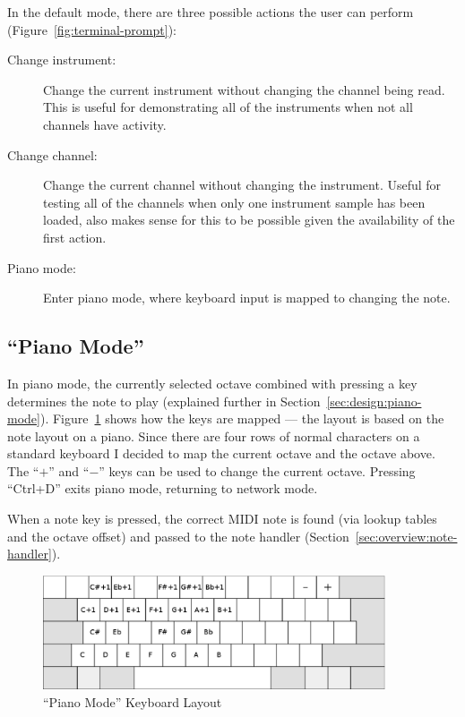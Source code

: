In the default mode, there are three possible actions the user can perform 
(Figure~\ref{fig:terminal-prompt}):

\begin{description}
\item[Change instrument:] Change the current instrument without changing the channel being read.  
This is useful for demonstrating all of the instruments when not all channels have activity.
\item[Change channel:] Change the current channel without changing the instrument.  Useful for 
testing all of the channels when only one instrument sample has been loaded, also makes sense for 
this to be possible given the availability of the first action.
\item[Piano mode:] Enter piano mode, where keyboard input is mapped to changing the note.
\end{description}

\subsection{``Piano Mode''}

In piano mode, the currently selected octave combined with pressing a key determines the note to 
play (explained further in Section~\ref{sec:design:piano-mode}).  Figure~\ref{fig:piano-mode} shows 
how the keys are mapped --- the layout is based on the note layout on a piano.  Since there are four 
rows of normal characters on a standard keyboard I decided to map the current octave and the octave 
above.  The ``$+$'' and ``$-$'' keys can be used to change the current octave.  Pressing ``Ctrl+D'' 
exits piano mode, returning to network mode.

When a note key is pressed, the correct MIDI note is found (via lookup tables and the octave offset) 
and passed to the note handler (Section~\ref{sec:overview:note-handler}).

\begin{figure}
\centering
\includegraphics[width=0.9\textwidth]{images/piano-mode}
\caption{``Piano Mode'' Keyboard Layout}\label{fig:piano-mode}
\end{figure}

